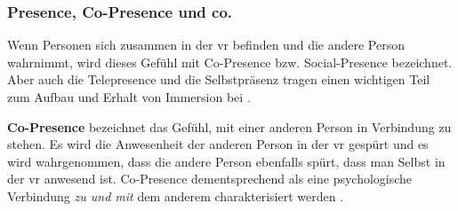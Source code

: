 \documentclass[a4paper,11pt]{article}%
\renewcommand{\\}{\vspace*{0.5\baselineskip} \newline}
\begin{document}
%			
			


		\subsubsection{Presence, Co-Presence und co.}
Wenn Personen sich zusammen in der \ac{vr} befinden und die andere Person wahrnimmt, wird dieses Gefühl mit \dq{}Co-Presence\dq{} bzw. \dq{}Social-Presence\dq{} bezeichnet. Aber auch die \dq{}Telepresence\dq{} und die \dq{}Selbstpräsenz\dq{} tragen einen wichtigen Teil zum Aufbau und Erhalt von Immersion bei \citep{schuemie2001research}.

\textbf{\dq Co-Presence\dq{}} bezeichnet das Gefühl, mit einer anderen Person in Verbindung zu stehen.
Es wird die Anwesenheit der anderen Person in der \ac{vr} gespürt und es wird wahrgenommen, dass die andere Person ebenfalls spürt, dass man Selbst in der \ac{vr} anwesend ist. 
Co-Presence dementsprechend als eine psychologische Verbindung \textit{zu und mit} dem anderem charakterisiert werden \citep[179-182]{ijsselsteijn2001presence}.
\end{document}
